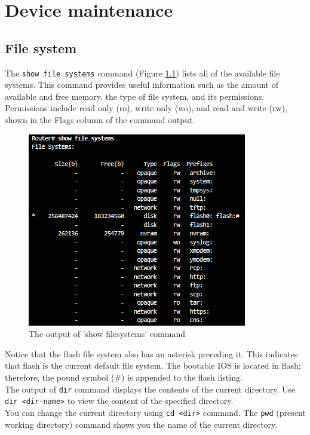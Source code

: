 \chapter{Device maintenance}

\section{File system}

The \verb|show file systems| command (Figure \ref{ShowFileSystem}) lists all of the available file systems. This command provides useful information such as the amount of available and free memory, the type of file system, and its permissions. Permissions include read only (ro), write only (wo), and read and write (rw), shown in the Flags column of the command output.\\

\begin{figure}[hbtp]
\caption{The output of 'show filesystems' command}\label{ShowFileSystem}
\centering
\includegraphics[scale=0.8]{pictures/ShowFileSystem.PNG}
\end{figure}

Notice that the flash file system also has an asterisk preceding it. This indicates that flash is the current default file system. The bootable IOS is located in flash; therefore, the pound symbol (\#) is appended to the flash listing.\\

The output of \verb|dir| command displays the contents of the current directory. Use \verb|dir <dir-name>| to view the content of the specified directory.\\

You can change the current directory using \verb|cd <dir>| command. The \verb|pwd| (present working directory) command shows you the name of the current directory. \\

